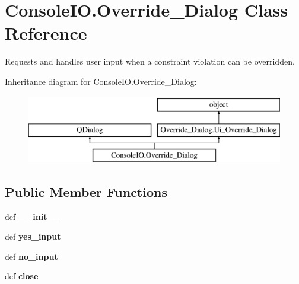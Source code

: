 \hypertarget{classConsoleIO_1_1Override__Dialog}{\section{Console\-I\-O.\-Override\-\_\-\-Dialog Class Reference}
\label{classConsoleIO_1_1Override__Dialog}
}


Requests and handles user input when a constraint violation can be overridden.  


Inheritance diagram for Console\-I\-O.\-Override\-\_\-\-Dialog\-:\begin{figure}[H]
\begin{center}
\leavevmode
\includegraphics[height=3.000000cm]{classConsoleIO_1_1Override__Dialog}
\end{center}
\end{figure}
\subsection*{Public Member Functions}
\begin{DoxyCompactItemize}
\item 
\hypertarget{classConsoleIO_1_1Override__Dialog_aa15cd0546885e3d9943018d155a7538f}{def {\bfseries \-\_\-\-\_\-init\-\_\-\-\_\-}}\label{classConsoleIO_1_1Override__Dialog_aa15cd0546885e3d9943018d155a7538f}

\item 
\hypertarget{classConsoleIO_1_1Override__Dialog_a6afe1bfec98f696850eae66a89a9b312}{def {\bfseries yes\-\_\-input}}\label{classConsoleIO_1_1Override__Dialog_a6afe1bfec98f696850eae66a89a9b312}

\item 
\hypertarget{classConsoleIO_1_1Override__Dialog_a5c5aa5c0030a6820a900f3217309a91c}{def {\bfseries no\-\_\-input}}\label{classConsoleIO_1_1Override__Dialog_a5c5aa5c0030a6820a900f3217309a91c}

\item 
\hypertarget{classConsoleIO_1_1Override__Dialog_aeefa5a9c5257908082b0b636cd1692bb}{def {\bfseries close}}\label{classConsoleIO_1_1Override__Dialog_aeefa5a9c5257908082b0b636cd1692bb}

\end{DoxyCompactItemize}
